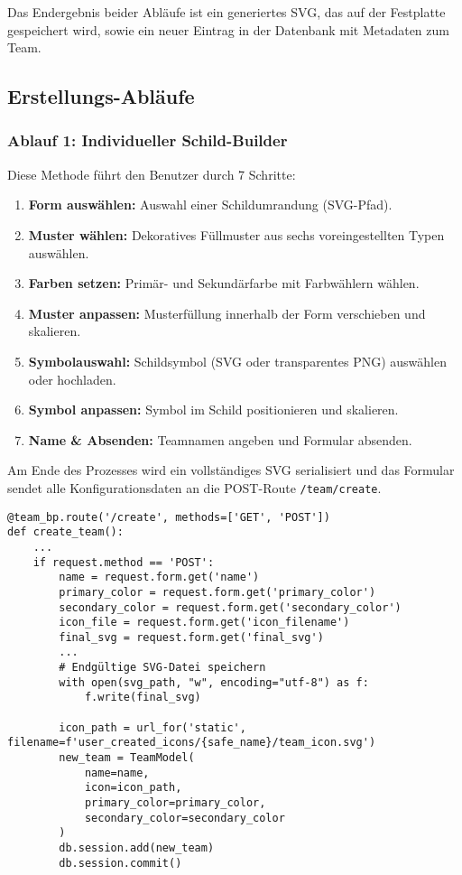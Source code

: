 \documentclass[12pt]{article}
\begin{document}
Das Endergebnis beider Abläufe ist ein generiertes SVG, das auf der Festplatte gespeichert wird, sowie ein neuer Eintrag in der Datenbank mit Metadaten zum Team.

\subsection{Erstellungs-Abläufe}

\subsubsection*{Ablauf 1: Individueller Schild-Builder}

Diese Methode führt den Benutzer durch 7 Schritte:

\begin{enumerate}
    \item \textbf{Form auswählen:} Auswahl einer Schildumrandung (SVG-Pfad).
    \item \textbf{Muster wählen:} Dekoratives Füllmuster aus sechs voreingestellten Typen auswählen.
    \item \textbf{Farben setzen:} Primär- und Sekundärfarbe mit Farbwählern wählen.
    \item \textbf{Muster anpassen:} Musterfüllung innerhalb der Form verschieben und skalieren.
    \item \textbf{Symbolauswahl:} Schildsymbol (SVG oder transparentes PNG) auswählen oder hochladen.
    \item \textbf{Symbol anpassen:} Symbol im Schild positionieren und skalieren.
    \item \textbf{Name & Absenden:} Teamnamen angeben und Formular absenden.
\end{enumerate}
\noindent Am Ende des Prozesses wird ein vollständiges SVG serialisiert und das Formular sendet alle Konfigurationsdaten an die POST-Route \texttt{/team/create}.

\begin{verbatim}
@team_bp.route('/create', methods=['GET', 'POST'])
def create_team():
    ...
    if request.method == 'POST':
        name = request.form.get('name')
        primary_color = request.form.get('primary_color')
        secondary_color = request.form.get('secondary_color')
        icon_file = request.form.get('icon_filename')
        final_svg = request.form.get('final_svg')
        ...
        # Endgültige SVG-Datei speichern
        with open(svg_path, "w", encoding="utf-8") as f:
            f.write(final_svg)

        icon_path = url_for('static', filename=f'user_created_icons/{safe_name}/team_icon.svg')
        new_team = TeamModel(
            name=name,
            icon=icon_path,
            primary_color=primary_color,
            secondary_color=secondary_color
        )
        db.session.add(new_team)
        db.session.commit()
\end{verbatim}
\end{document}
